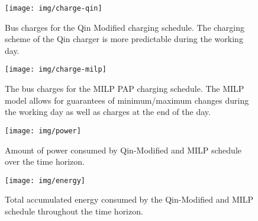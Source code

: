 \documentclass[utf8]{FrontiersinHarvard}
\begin{document}
\begin{subfigures}
    \begin{figure}[htpb]
    \centering
        \texttt{[image: img/charge-qin]}
        \caption{Bus charges for the Qin Modified charging schedule. The charging scheme of the Qin charger is more predictable during the working day.}
        \label{subfig:qin-charge}
    \end{figure}

    \hfill

    \begin{figure}[htpb]
    \centering
        \texttt{[image: img/charge-milp]}
        \caption{The bus charges for the MILP PAP charging schedule. The MILP model allows for guarantees of minimum/maximum changes during the working day as well as charges at the end of the day.}
        \label{subfig:milp-charge}
    \end{figure}
\end{subfigures}

\begin{figure}[htpb]
\centering
    \texttt{[image: img/power]}
    \caption{Amount of power consumed by Qin-Modified and MILP schedule over the time horizon.}
    \label{fig:power-usage}
\end{figure}

\begin{figure}[htpb]
\centering
    \texttt{[image: img/energy]}
    \caption{Total accumulated energy consumed by the Qin-Modified and MILP schedule throughout the time horizon.}
    \label{fig:energy-usage}
\end{figure}
\end{document}

